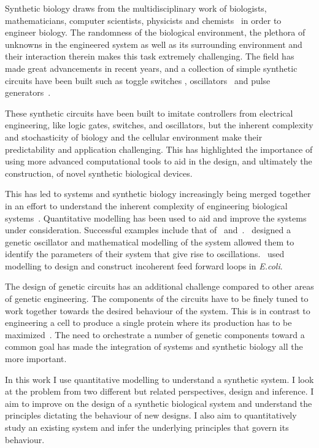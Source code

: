 Synthetic biology draws from the multidisciplinary work of biologists, mathematicians, computer scientists, physicists and chemists~\autocite{Vinson:2011hu} in order to engineer biology. The randomness of the biological environment, the plethora of unknowns in the engineered system as well as its surrounding environment and their interaction therein makes this task extremely challenging. The field has made great advancements in recent years, and a collection of simple synthetic circuits have been built such as toggle switches \autocite{Gardner:2000vha, Kramer:2004kq, Isaacs:2003hta, Ham:2008hh, Deans:2007cy, Friedland:2009ce}, oscillators~\autocite{Stricker:2008jqa, Fung:2005jd, Tigges:2009jx} and pulse generators~\autocite{Basu:2004gn}.  

These synthetic circuits have been built to imitate controllers from electrical engineering, like logic gates, switches, and oscillators, but the inherent complexity and stochasticity of biology and the cellular environment make their predictability and application challenging. This has highlighted the importance of using more advanced computational tools to aid in the design, and ultimately the construction, of novel synthetic biological devices. 

This has led to systems and synthetic biology increasingly being merged together in an effort to understand the inherent complexity of engineering biological systems~\autocite{Gramelsberger:2013iu}. Quantitative modelling has been used to aid and improve the systems under consideration. Successful examples include that of~\textcite{Stricker:2008jqa} and~\textcite{Entus:wy}.~\textcite{Stricker:2008jqa}  designed a genetic oscillator and mathematical modelling of the system allowed them to identify the parameters of their system that give rise to oscillations.~\textcite{Entus:wy} used modelling to design and construct incoherent feed forward loops in \textit{E.coli}.   

The design of genetic circuits has an additional challenge compared to other areas of genetic engineering. The components of the circuits have to be finely tuned to work together towards the desired behaviour of the system. This is in contrast to engineering a cell to produce a single protein where its production has to be maximized~\autocite{Nielsen:2013hs}. The need to orchestrate a number of genetic components toward a common goal has made the integration of systems and synthetic biology all the more important.


In this work I use quantitative modelling to understand a synthetic system. I look at the problem from two different but related perspectives, design and inference. I aim to improve on the design of a synthetic biological system and understand the principles dictating the behaviour of new designs. I also aim to quantitatively study an existing system and infer the underlying principles that govern its behaviour. 




